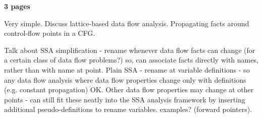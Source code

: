 \textbf{3 pages}

Very simple. Discuss lattice-based data flow analysis.
Propagating facts around control-flow points in a CFG.

Talk about SSA simplification - rename whenever data flow
facts can change (for a certain class of data flow problems?)
so, can associate facts directly with names, rather than with
name at point.
Plain SSA - rename at variable definitions - so any data flow
analysis where data flow properties change only with definitions
(e.g. constant propagation) OK. Other data flow properties may 
change at other points - can still fit these neatly into the SSA
analysis framework by inserting additional pseudo-definitions
to rename variables. examples? (forward pointers).


